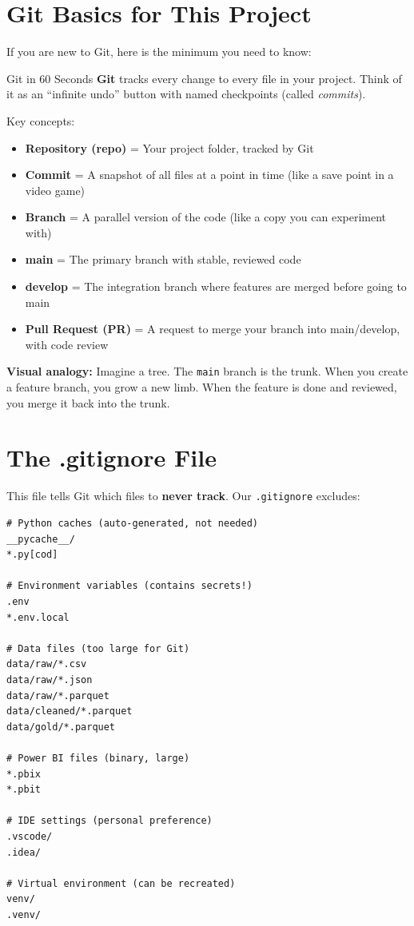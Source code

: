 \documentclass[12pt, a4paper, oneside]{report}
\begin{document}
\section{Git Basics for This Project}

If you are new to Git, here is the minimum you need to know:

\begin{conceptbox}{Git in 60 Seconds}
\textbf{Git} tracks every change to every file in your project. Think of it as an ``infinite undo'' button with named checkpoints (called \textit{commits}).

Key concepts:
\begin{itemize}
    \item \textbf{Repository (repo)} = Your project folder, tracked by Git
    \item \textbf{Commit} = A snapshot of all files at a point in time (like a save point in a video game)
    \item \textbf{Branch} = A parallel version of the code (like a copy you can experiment with)
    \item \textbf{main} = The primary branch with stable, reviewed code
    \item \textbf{develop} = The integration branch where features are merged before going to main
    \item \textbf{Pull Request (PR)} = A request to merge your branch into main/develop, with code review
\end{itemize}

\textbf{Visual analogy:} Imagine a tree. The \texttt{main} branch is the trunk. When you create a feature branch, you grow a new limb. When the feature is done and reviewed, you merge it back into the trunk.
\end{conceptbox}

\section{The .gitignore File}

This file tells Git which files to \textbf{never track}. Our \texttt{.gitignore} excludes:

\begin{lstlisting}[style=bashstyle, caption={Key sections of .gitignore}]
# Python caches (auto-generated, not needed)
__pycache__/
*.py[cod]

# Environment variables (contains secrets!)
.env
*.env.local

# Data files (too large for Git)
data/raw/*.csv
data/raw/*.json
data/raw/*.parquet
data/cleaned/*.parquet
data/gold/*.parquet

# Power BI files (binary, large)
*.pbix
*.pbit

# IDE settings (personal preference)
.vscode/
.idea/

# Virtual environment (can be recreated)
venv/
.venv/
\end{lstlisting}
\end{document}

